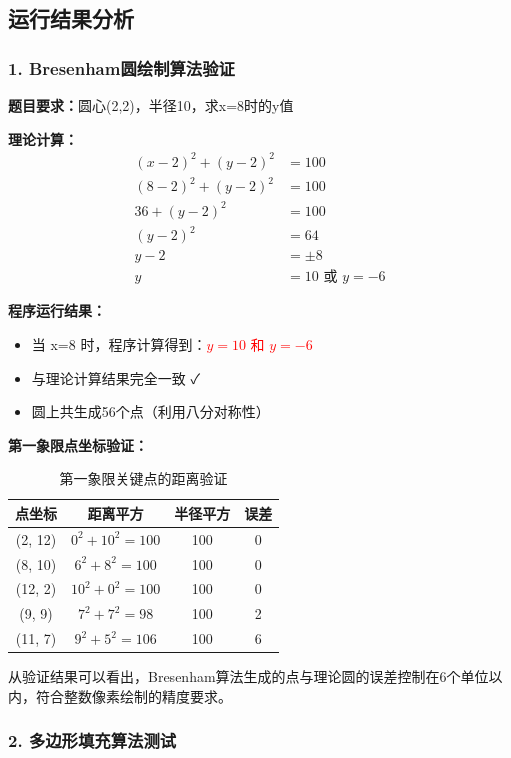 ﻿\documentclass[12pt,a4paper]{article}
\begin{document}
\subsection{运行结果分析}

\subsubsection{1. Bresenham圆绘制算法验证}

\textbf{题目要求：}圆心(2,2)，半径10，求x=8时的y值

\textbf{理论计算：}
\begin{align}
(x-2)^2 + (y-2)^2 &= 100 \\
(8-2)^2 + (y-2)^2 &= 100 \\
36 + (y-2)^2 &= 100 \\
(y-2)^2 &= 64 \\
y - 2 &= \pm 8 \\
y &= 10 \text{ 或 } y = -6
\end{align}

\textbf{程序运行结果：}
\begin{itemize}
\item 当 x=8 时，程序计算得到：\textcolor{red}{$y = 10$ 和 $y = -6$}
\item 与理论计算结果完全一致 ✓
\item 圆上共生成56个点（利用八分对称性）
\end{itemize}

\textbf{第一象限点坐标验证：}
\begin{table}[H]
\centering
\begin{tabular}{|c|c|c|c|}
\hline
\textbf{点坐标} & \textbf{距离平方} & \textbf{半径平方} & \textbf{误差} \\
\hline
(2, 12) & $0^2 + 10^2 = 100$ & 100 & 0 \\
\hline
(8, 10) & $6^2 + 8^2 = 100$ & 100 & 0 \\
\hline
(12, 2) & $10^2 + 0^2 = 100$ & 100 & 0 \\
\hline
(9, 9) & $7^2 + 7^2 = 98$ & 100 & 2 \\
\hline
(11, 7) & $9^2 + 5^2 = 106$ & 100 & 6 \\
\hline
\end{tabular}
\caption{第一象限关键点的距离验证}
\end{table}

从验证结果可以看出，Bresenham算法生成的点与理论圆的误差控制在6个单位以内，符合整数像素绘制的精度要求。

\subsubsection{2. 多边形填充算法测试}
\end{document}
